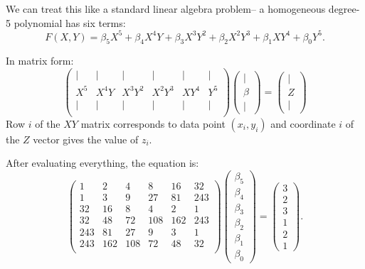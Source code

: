 \documentclass[12pt]{amsart}
\begin{document}
\begin{enumerate}
\vspace{5mm}

We can treat this like a standard linear algebra problem--
a homogeneous degree-5 polynomial has six terms:
\[F(X,Y) = \beta_5 X^5 + \beta_4 X^4Y + \beta_3 X^3Y^2 + \beta_2 X^2Y^3 + \beta_1 XY^4 + \beta_0 Y^5.\] 

In matrix form:
\[ \left(
\begin{array}{cccccc}
| & | & | & | & | & | \\
 X^5  & X^4Y &  X^3Y^2  & X^2Y^3 & XY^4 &  Y^5 \\
| & | & | & | & | & | \\
\end{array}\right)
\left( \begin{array}{c}
| \\ \beta \\ | \end{array}
\right) =
\left( \begin{array}{c}
| \\ Z \\ | \end{array}
\right)
\]
Row $i$ of the $XY$ matrix corresponds to data point $(x_i,y_i)$
and coordinate $i$ of the $Z$ vector gives the value of $z_i$.

After evaluating everything, the equation is:
\[\left(
\begin{array}{cccccc}
     1  &   2 &    4 &    8 &   16 &   32 \\
     1  &   3 &    9 &   27 &   81 &  243 \\
    32  &  16 &    8 &    4 &    2 &    1 \\
    32  &  48 &   72 &  108 &  162 &  243 \\
   243  &  81 &   27 &    9 &    3 &    1 \\
   243  & 162 &  108 &   72 &   48 &   32 \\
\end{array}\right)
\left(\begin{array}{c} \beta_5 \\ \beta_4 \\ \beta_3 \\ \beta_2 \\ \beta_1 \\ \beta_0 \end{array} \right) = \left(
\begin{array}{c} 3 \\ 2 \\ 3 \\ 1 \\ 2 \\ 1 \end{array}
\right).\]


\end{enumerate}
\end{document}
